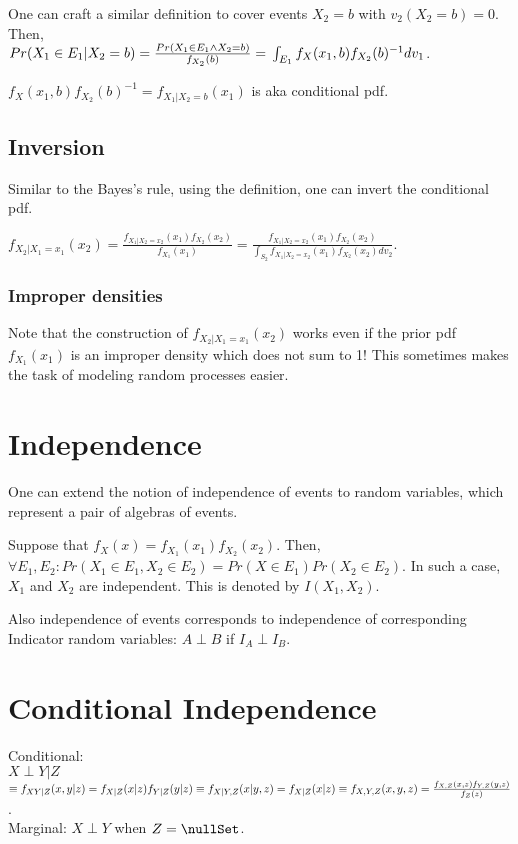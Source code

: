 \documentclass[oneside, article]{memoir}
\begin{document}
One can craft a similar definition to cover events $X_2 = b$ with $v_2(X_2 = b) = 0$. Then, \\$Pr(X_1 \in E_1| X_2 = b) = \frac{Pr(X_1 \in E_1 \land X_2 = b)}{f_{X_2}(b)} = \\
\int_{E_1} f_{X}(x_1, b) f_{X_2}(b)^{-1} dv_1$.

$f_{X}(x_1, b) f_{X_2}(b)^{-1} = f_{X_1|X_2 = b}(x_1)$ is aka conditional pdf.

\subsection{Inversion}
Similar to the Bayes's rule, using the definition, one can invert the conditional pdf.

$f_{X_2|X_1 = x_1}(x_2) = \frac{f_{X_1|X_2 = x_2}(x_1)f_{X_2}(x_2)}{f_{X_1}(x_1)} = \frac{f_{X_1|X_2 = x_2}(x_1)f_{X_2}(x_2)}{\int_{S_2} f_{X_1|X_2 = x_2}(x_1)f_{X_2}(x_2) dv_2}$.

\subsubsection{Improper densities}
Note that the construction of $f_{X_2|X_1 = x_1}(x_2)$ works even if the prior pdf $f_{X_1}(x_1)$ is an improper density which does not sum to 1! This sometimes makes the task of modeling random processes easier.

\section{Independence}
One can extend the notion of independence of events to random variables, which represent a pair of algebras of events.

Suppose that $f_{X}(x) = f_{X_1}(x_1)f_{X_2}(x_2)$. Then,  $\forall E_1, E_2: Pr(X_1 \in E_1, X_2 \in E_2) = Pr(X \in E_1)Pr(X_2 \in E_2)$. In such a case, $X_1$ and $X_2$ are independent. This is denoted by $I(X_1, X_2)$.

Also independence of events corresponds to independence of corresponding Indicator random variables: $A \perp B$ if $I_A \perp I_B$.

\section{Conditional Independence}
Conditional: \\$X \perp Y|Z$ $\equiv  f_{XY|Z}(x, y|z) = f_{X|Z}(x|z)f_{Y|Z}(y|z) \equiv f_{X|Y, Z}(x|y,z) = f_{X|Z}(x|z) \\
\equiv  f_{X, Y, Z}(x, y, z) = \frac{f_{X, Z}(x,z)f_{Y, Z}(y, z)}{f_Z(z)}$.\\
Marginal: $X \perp Y$ when $Z = \nullSet$.
\end{document}
